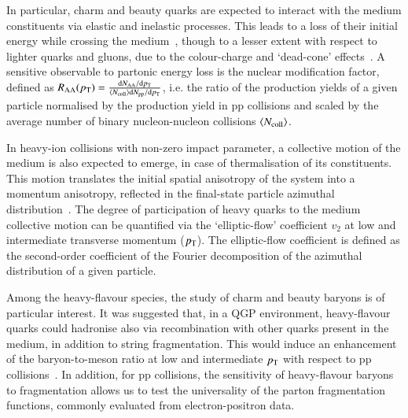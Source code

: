 \documentclass{webofc}
\newcommand{\pt}{p_{\rm T}}
\begin{document}
In particular, charm and beauty quarks are expected to interact with the medium constituents via elastic and inelastic processes. This leads to a loss of their initial energy while crossing the medium~\cite{Gyulassy:1990ye,Baier:1996sk,Thoma:1990fm}, though to a lesser extent with respect to lighter quarks and gluons, due to the colour-charge and `dead-cone' effects~\cite{Armesto:2005iq}.
A sensitive observable to partonic energy loss is the nuclear modification factor, defined as $R_{\rm AA}(\pt) = \frac{{\rm d}N_{\rm AA}/{\rm d}\pt}{\langle N_{\rm coll} \rangle {\rm d}N_{\rm pp}/{\rm d}\pt}$, i.e. the ratio of the production yields of a given particle normalised by the production yield in pp collisions and scaled by the average number of binary nucleon-nucleon collisions $\langle N_{\rm coll} \rangle$.

In heavy-ion collisions with non-zero impact parameter, a collective motion of the medium is also expected to emerge, in case of thermalisation of its constituents. This motion translates the initial spatial anisotropy of the system into a momentum anisotropy, reflected in the final-state particle azimuthal distribution~\cite{Ollitrault:1992bk}. The degree of participation of heavy quarks to the medium collective motion can be quantified via the `elliptic-flow' coefficient $v_2$ at low and intermediate transverse momentum ($\pt$). The elliptic-flow coefficient is defined as the second-order coefficient of the Fourier decomposition of the azimuthal distribution of a given particle.

Among the heavy-flavour species, the study of charm and beauty baryons is of particular interest. It was suggested that, in a QGP environment, heavy-flavour quarks could hadronise also via recombination with other quarks present in the medium, in addition to string fragmentation. This would induce an enhancement of the baryon-to-meson ratio at low and intermediate $\pt$ with respect to pp collisions~\cite{Greco:2003vf,Oh:2009zj}.
In addition, for pp collisions, the sensitivity of heavy-flavour baryons to fragmentation allows us to test the universality of the parton fragmentation functions, commonly evaluated from electron-positron data.
\end{document}
